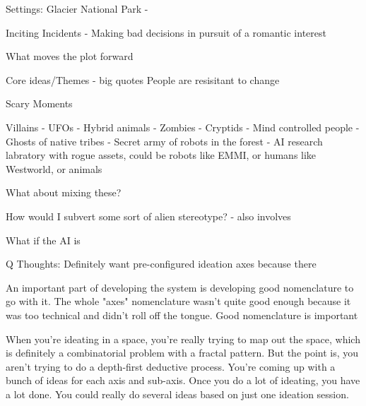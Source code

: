 Settings:
Glacier National Park
- 

Inciting Incidents
- Making bad decisions in pursuit of a romantic interest


What moves the plot forward



Core ideas/Themes - big quotes
People are resisitant to change




Scary Moments




Villains
- UFOs
- Hybrid animals
- Zombies
- Cryptids
- Mind controlled people
- Ghosts of native tribes
- Secret army of robots in the forest
- AI research labratory with rogue assets, could be robots like EMMI, or humans like Westworld, or animals


What about mixing these?

How would I subvert some sort of alien stereotype?
- also involves

What if the AI is 




Q Thoughts:
Definitely want pre-configured ideation axes because there

An important part of developing the system is developing good nomenclature to go with it. The whole "axes" nomenclature wasn't quite good enough because it was too technical and didn't roll off the tongue. Good nomenclature is important

When you're ideating in a space, you're really trying to map out the space, which is definitely a combinatorial problem with a fractal pattern. But the point is, you aren't trying to do a depth-first deductive process. You're coming up with a bunch of ideas for each axis and sub-axis. Once you do a lot of ideating, you have a lot done. You could really do several ideas based on just one ideation session.

